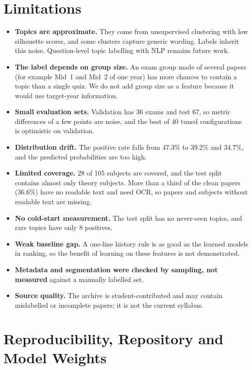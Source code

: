 \documentclass[11pt,a4paper]{article}
\begin{document}
\section{Limitations}
\label{sec:limits}

\begin{itemize}
\item \textbf{Topics are approximate.} They come from unsupervised clustering with low silhouette scores, and some clusters
capture generic wording. Labels inherit this noise. Question-level topic labelling with NLP remains future work.
\item \textbf{The label depends on group size.} An exam group made of several papers (for example Mid~1 and Mid~2 of one year)
has more chances to contain a topic than a single quiz. We do not add group size as a feature because it would use target-year
information.
\item \textbf{Small evaluation sets.} Validation has 36 exams and test 67, so metric differences of a few points are noise, and
the best of 40 tuned configurations is optimistic on validation.
\item \textbf{Distribution drift.} The positive rate falls from 47.3\% to 39.2\% and 34.7\%, and the predicted probabilities
are too high.
\item \textbf{Limited coverage.} 28 of 105 subjects are covered, and the test split contains almost only theory subjects. More than a third of the clean papers
(36.6\%) have no readable text and need OCR, so papers and subjects without readable text are missing.
\item \textbf{No cold-start measurement.} The test split has no never-seen topics, and rare topics have only 8 positives.
\item \textbf{Weak baseline gap.} A one-line history rule is as good as the learned models in ranking, so the benefit of
learning on these features is not demonstrated.
\item \textbf{Metadata and segmentation were checked by sampling, not measured} against a manually labelled set.
\item \textbf{Source quality.} The archive is student-contributed and may contain mislabelled or incomplete papers; it is not
the current syllabus.
\end{itemize}

\section{Reproducibility, Repository and Model Weights}
\label{sec:repro}
\end{document}
